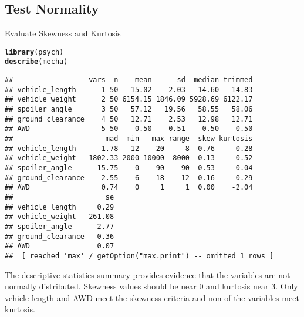 \documentclass[a4paper, 12pt]{article}\usepackage[]{graphicx}\usepackage[]{color}
\makeatletter
\newcommand{\hlstd}[1]{\textcolor[rgb]{0.345,0.345,0.345}{#1}}%
\newcommand{\hlkwd}[1]{\textcolor[rgb]{0.737,0.353,0.396}{\textbf{#1}}}%
\newenvironment{kframe}{%
 \def\at@end@of@kframe{}%
 \ifinner\ifhmode%
  \def\at@end@of@kframe{\end{minipage}}%
  \begin{minipage}{\columnwidth}%
 \fi\fi%
 \def\FrameCommand##1{\hskip\@totalleftmargin \hskip-\fboxsep
 \colorbox{shadecolor}{##1}\hskip-\fboxsep
     \hskip-\linewidth \hskip-\@totalleftmargin \hskip\columnwidth}%
 \MakeFramed {\advance\hsize-\width
   \@totalleftmargin\z@ \linewidth\hsize
   \@setminipage}}%
 {\par\unskip\endMakeFramed%
 \at@end@of@kframe}
\newenvironment{knitrout}{}{} %
\makeatother
\begin{document}
\subsection{Test Normality}

Evaluate Skewness and Kurtosis
\begin{knitrout}
\color{fgcolor}\begin{kframe}
\begin{alltt}
\hlkwd{library}\hlstd{(psych)}
\hlkwd{describe}\hlstd{(mecha)}
\end{alltt}
\begin{verbatim}
##                  vars  n    mean      sd  median trimmed
## vehicle_length      1 50   15.02    2.03   14.60   14.83
## vehicle_weight      2 50 6154.15 1846.09 5928.69 6122.17
## spoiler_angle       3 50   57.12   19.56   58.55   58.06
## ground_clearance    4 50   12.71    2.53   12.98   12.71
## AWD                 5 50    0.50    0.51    0.50    0.50
##                      mad  min   max range  skew kurtosis
## vehicle_length      1.78   12    20     8  0.76    -0.28
## vehicle_weight   1802.33 2000 10000  8000  0.13    -0.52
## spoiler_angle      15.75    0    90    90 -0.53     0.04
## ground_clearance    2.55    6    18    12 -0.16    -0.29
## AWD                 0.74    0     1     1  0.00    -2.04
##                      se
## vehicle_length     0.29
## vehicle_weight   261.08
## spoiler_angle      2.77
## ground_clearance   0.36
## AWD                0.07
##  [ reached 'max' / getOption("max.print") -- omitted 1 rows ]
\end{verbatim}
\end{kframe}
\end{knitrout}

The descriptive statistics summary provides evidence that the variables are not normally distributed. Skewness values should be near 0 and kurtosis near 3. Only vehicle length and AWD meet the skewness criteria and non of the variables meet kurtosis. 
\end{document}
